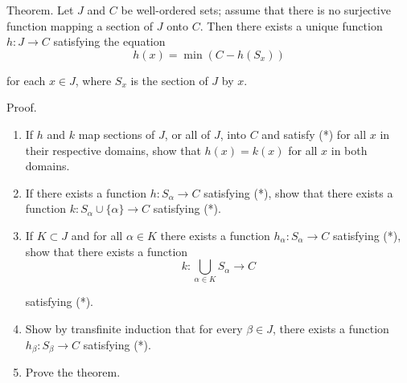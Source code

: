 \begin{exercise}\label{chapter1:section10:exercise10}
    Theorem. Let $J$ and $C$ be well-ordered sets; assume that there is no surjective function mapping a section of $J$ onto $C$. Then there exists a unique function $h: J\to C$ satisfying the equation
    \[
        h(x) = \min (C - h(S_{x}))\tag{*}
    \]

    for each $x\in J$, where $S_{x}$ is the section of $J$ by $x$.

    Proof.
    \begin{enumerate}[label={(\alph*)}]
        \item If $h$ and $k$ map sections of $J$, or all of $J$, into $C$ and satisfy (*) for all $x$ in their respective domains, show that $h(x) = k(x)$ for all $x$ in both domains.
        \item If there exists a function $h: S_{\alpha}\to C$ satisfying (*), show that there exists a function $k: S_{\alpha}\cup \{ \alpha \}\to C$ satisfying (*).
        \item If $K\subset J$ and for all $\alpha\in K$ there exists a function $h_{\alpha}: S_{\alpha}\to C$ satisfying (*), show that there exists a function
              \[
                  k: \bigcup_{\alpha\in K}S_{\alpha}\to C
              \]

              satisfying (*).
        \item Show by transfinite induction that for every $\beta\in J$, there exists a function $h_{\beta}: S_{\beta}\to C$ satisfying (*).
        \item Prove the theorem.
    \end{enumerate}
\end{exercise}

